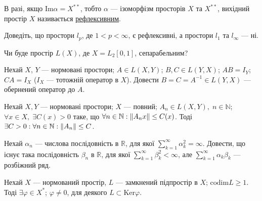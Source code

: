 \begin{theory}
    В разі, якщо $\mathrm{Im}\alpha = X^{**}$, тобто $\alpha$ --- ізоморфізм просторів $X$ та $X^{**}$,
    вихідний простір $X$ називається \underline{рефлексивним}.
\end{theory}

\begin{exercise}
    Доведіть, що простори  $l_p$, де $1<p<\infty$, є рефлексивні, а простори $l_1$ та $l_\infty$ --- ні.
\end{exercise}

\begin{exercise}
    Чи буде простір $L(X)$, де $X=L_2[0,1]$, сепарабельним?
\end{exercise}

\begin{exercise}
    Нехай $X$, $Y$ --- нормовані простори; $A \in L\left( X, Y\right)$; $B, C \in L\left( Y, X\right)$;
    $AB = I_Y$; $CA = I_X$ ($I_X$ --- тотожній оператор в $X$).
    Довести $B = C = A^{-1} \in L\left( Y, X\right)$ --- обернений оператор до $A$.
\end{exercise}

\begin{theory}
    \begin{theorem*}
        Нехай $X, Y$ --- нормовані простори; $X$ --- повний; $A_n \in L\left( X, Y\right),\; n\in \mathbb{N}$;
        $\forall x \in X, \; \exists C(x) > 0$ таке, що $\forall n \in \mathbb{N}: \left\lVert A_n x\right\rVert \leq C(x)$.
        Тоді $\exists C>0: \forall n \in \mathbb{N}: \left\lVert A_n\right\rVert \leq C$.
    \end{theorem*}
\end{theory}

\begin{exercise}
    Нехай $\alpha_n$ --- числова послідовність в $\mathbb{R}$, для якої 
    $\sum^\infty_{k=1} \alpha^2_k =\infty$. Довести, що існує така послідовність 
    $\beta_n$ в $\mathbb{R}$, для якої $\sum^\infty_{k=1} \beta^2_k < \infty$, 
    але $\sum^\infty_{k=1} \alpha_k\beta_k$ --- розбіжний ряд.
\end{exercise}

\begin{exercise}
    Нехай $X$ --- нормований простір, $L$ --- замкнений підпростір в $X$; $\mathrm{codim}L \geq 1$.
    Тоді $\exists \varphi \in X^*$; $\varphi \neq 0$, для деякого $L \subset \mathrm{Ker}\varphi$.
\end{exercise}

